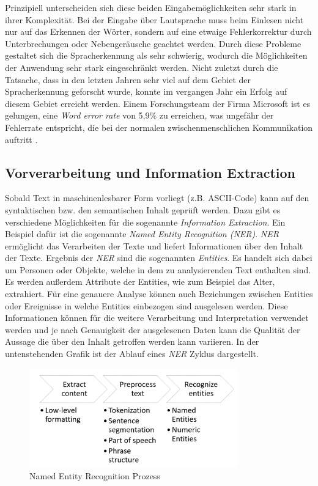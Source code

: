 Prinzipiell unterscheiden sich diese beiden Eingabemöglichkeiten sehr stark in ihrer Komplexität. Bei der Eingabe über Lautsprache muss beim Einlesen nicht nur auf das Erkennen der Wörter, sondern auf eine etwaige Fehlerkorrektur durch Unterbrechungen oder Nebengeräusche geachtet werden. Durch diese Probleme gestaltet sich die Spracherkennung als sehr schwierig, wodurch die Möglichkeiten der Anwendung sehr stark eingeschränkt werden. Nicht zuletzt durch die Tatsache, dass in den letzten Jahren sehr viel auf dem Gebiet der Spracherkennung geforscht wurde, konnte im vergangen Jahr ein Erfolg auf diesem Gebiet erreicht werden. Einem Forschungsteam der Firma Microsoft ist es gelungen, eine \textit{Word error rate} von 5,9\% zu erreichen, was ungefähr der Fehlerrate entspricht, die bei der normalen zwischenmenschlichen Kommunikation auftritt \cite{Xiong2016}. 

\subsection{Vorverarbeitung und Information Extraction}
Sobald Text in maschinenlesbarer Form vorliegt (z.B. ASCII-Code) kann auf den syntaktischen bzw. den semantischen Inhalt geprüft werden. Dazu gibt es verschiedene Möglichkeiten für die sogenannte \textit{Information Extraction}. Ein Beispiel dafür ist die sogenannte \textit{Named Entity Recognition (NER)}. \textit{NER} ermöglicht das Verarbeiten der Texte und liefert Informationen über den Inhalt der Texte. Ergebnis der \textit{NER} sind die sogenannten \textit{Entities}. Es handelt sich dabei um Personen oder Objekte, welche in dem zu analysierenden Text enthalten sind. Es werden außerdem Attribute der Entities, wie zum Beispiel das Alter, extrahiert. Für eine genauere Analyse können auch Beziehungen zwischen Entities oder Ereignisse in welche Entities einbezogen sind ausgelesen werden. Diese Informationen können für die weitere Verarbeitung und Interpretation verwendet werden und je nach Genauigkeit der ausgelesenen Daten kann die Qualität der Aussage die über den Inhalt getroffen werden kann variieren. In der untenstehenden Grafik ist der Ablauf eines \textit{NER} Zyklus dargestellt.

\begin{figure}[ht]
	\centering
		\includegraphics[width=0.80\textwidth]{images/ner-pipeline.PNG}
	\caption{Named Entity Recognition Prozess}
	\label{fig:ner-pipeline}
\end{figure}

